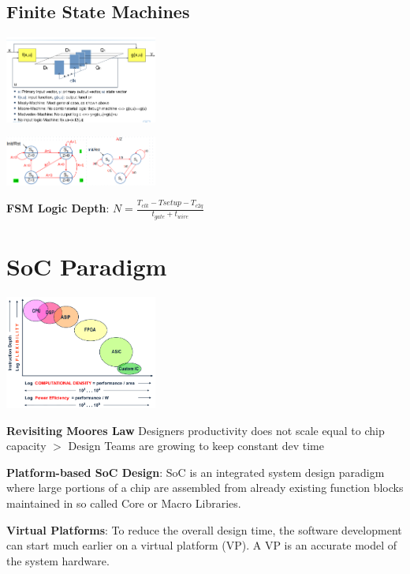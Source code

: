 \documentclass[english]{latex4ei/latex4ei_sheet}
\begin{document}
\subsection{Finite State Machines}
\begin{center}
	\includegraphics[width = 5cm]{images/2. SoC Logic Design Recap/FSM.png}
\end{center}
\begin{center}
	\includegraphics[width = 5cm]{images/2. SoC Logic Design Recap/MooreMealy.png}
\end{center}

\textbf{FSM Logic Depth}: $N = \frac{T_{clk} - T{setup} - T_{c2q}}{t_{gate} + t_{wire}}$



\section{SoC Paradigm}
\begin{center}
	\includegraphics[width = 5cm]{images/3.SoCParadigm/Paradigm.png}
\end{center}

\textbf{Revisiting Moores Law} Designers productivity does not scale equal to chip capacity $>$ Design Teams are growing to keep constant dev time

\textbf{Platform-based SoC Design}: SoC is an integrated system design paradigm where large portions of a chip are assembled from already existing function blocks maintained in so called Core or Macro Libraries.

\textbf{Virtual Platforms}: To reduce the overall design time, the software development can start much earlier on a virtual platform (VP). A VP is an accurate model of the system hardware.
\end{document}
